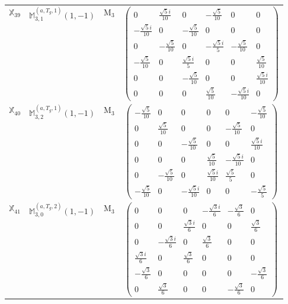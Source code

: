 \documentclass[fleqn,10pt,landscape]{article}
\begin{document}
\begin{itemize}
\begin{center}
\begin{longtable}{c|c|c|c}
$ \mathbb{X}_{39} $ & $\mathbb{M}_{3,1}^{(a,T_{g},1)}(1,-1)$ & M$_{3}$ & $\begin{pmatrix} 0 & \frac{\sqrt{5} i}{10} & 0 & - \frac{\sqrt{5}}{10} & 0 & 0 \\ - \frac{\sqrt{5} i}{10} & 0 & - \frac{\sqrt{5}}{10} & 0 & 0 & 0 \\ 0 & - \frac{\sqrt{5}}{10} & 0 & - \frac{\sqrt{5} i}{5} & - \frac{\sqrt{5}}{10} & 0 \\ - \frac{\sqrt{5}}{10} & 0 & \frac{\sqrt{5} i}{5} & 0 & 0 & \frac{\sqrt{5}}{10} \\ 0 & 0 & - \frac{\sqrt{5}}{10} & 0 & 0 & \frac{\sqrt{5} i}{10} \\ 0 & 0 & 0 & \frac{\sqrt{5}}{10} & - \frac{\sqrt{5} i}{10} & 0 \end{pmatrix}$ \\
$ \mathbb{X}_{40} $ & $\mathbb{M}_{3,2}^{(a,T_{g},1)}(1,-1)$ & M$_{3}$ & $\begin{pmatrix} - \frac{\sqrt{5}}{10} & 0 & 0 & 0 & 0 & - \frac{\sqrt{5}}{10} \\ 0 & \frac{\sqrt{5}}{10} & 0 & 0 & - \frac{\sqrt{5}}{10} & 0 \\ 0 & 0 & - \frac{\sqrt{5}}{10} & 0 & 0 & \frac{\sqrt{5} i}{10} \\ 0 & 0 & 0 & \frac{\sqrt{5}}{10} & - \frac{\sqrt{5} i}{10} & 0 \\ 0 & - \frac{\sqrt{5}}{10} & 0 & \frac{\sqrt{5} i}{10} & \frac{\sqrt{5}}{5} & 0 \\ - \frac{\sqrt{5}}{10} & 0 & - \frac{\sqrt{5} i}{10} & 0 & 0 & - \frac{\sqrt{5}}{5} \end{pmatrix}$ \\
$ \mathbb{X}_{41} $ & $\mathbb{M}_{3,0}^{(a,T_{g},2)}(1,-1)$ & M$_{3}$ & $\begin{pmatrix} 0 & 0 & 0 & - \frac{\sqrt{3} i}{6} & - \frac{\sqrt{3}}{6} & 0 \\ 0 & 0 & \frac{\sqrt{3} i}{6} & 0 & 0 & \frac{\sqrt{3}}{6} \\ 0 & - \frac{\sqrt{3} i}{6} & 0 & \frac{\sqrt{3}}{6} & 0 & 0 \\ \frac{\sqrt{3} i}{6} & 0 & \frac{\sqrt{3}}{6} & 0 & 0 & 0 \\ - \frac{\sqrt{3}}{6} & 0 & 0 & 0 & 0 & - \frac{\sqrt{3}}{6} \\ 0 & \frac{\sqrt{3}}{6} & 0 & 0 & - \frac{\sqrt{3}}{6} & 0 \end{pmatrix}$ \\

\end{longtable}
\end{center}
\end{itemize}
\end{document}
